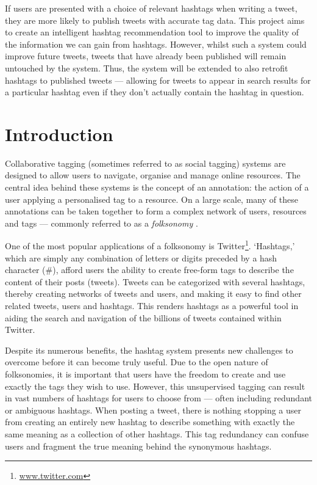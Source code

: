 \documentclass[12pt,a4paper]{article}
\begin{document}
If users are presented with a choice of relevant hashtags when writing a tweet, they are more likely to publish tweets with accurate tag data. This project aims to create an intelligent hashtag recommendation tool to improve the quality of the information we can gain from hashtags. However, whilst such a system could improve future tweets, tweets that have already been published will remain untouched by the system. Thus, the system will be extended to also retrofit hashtags to published tweets --- allowing for tweets to appear in search results for a particular hashtag even if they don't actually contain the hashtag in question.
\pagebreak

\tableofcontents

\pagebreak

\section{Introduction}
Collaborative tagging (sometimes referred to as social tagging) systems are designed to allow users to navigate, organise and manage online resources. The central idea behind these systems is the concept of an annotation: the action of a user applying a personalised tag to a resource. On a large scale, many of these annotations can be taken together to form a complex network of users, resources and tags --- commonly referred to as a \emph{folksonomy} \parencite{Xu:2008}.

One of the most popular applications of a folksonomy is Twitter\footnote{\url{www.twitter.com}}. `Hashtags,' which are simply any combination of letters or digits preceded by a hash character (\#), afford users the ability to create free-form tags to describe the content of their posts (tweets). Tweets can be categorized with several hashtags, thereby creating networks of tweets and users, and making it easy to find other related tweets, users and hashtags. This renders hashtags as a powerful tool in aiding the search and navigation of the billions of tweets contained within Twitter.

Despite its numerous benefits, the hashtag system presents new challenges to overcome before it can become truly useful. Due to the open nature of folksonomies, it is important that users have the freedom to create and use exactly the tags they wish to use. However, this unsupervised tagging can result in vast numbers of hashtags for users to choose from --- often including redundant or ambiguous hashtags. When posting a tweet, there is nothing stopping a user from creating an entirely new hashtag to describe something with exactly the same meaning as a collection of other hashtags. This tag redundancy can confuse users and fragment the true meaning behind the synonymous hashtags.
\end{document}
